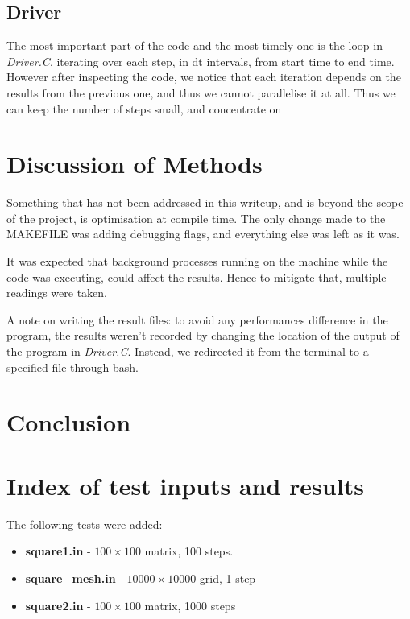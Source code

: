 \documentclass[11pt,journal]{IEEEtran}
\begin{document}
	\subsection{Driver}
	The most important part of the code and the most timely one is the loop in \emph{Driver.C}, iterating over each step, in dt intervals, from start time to end time. However after inspecting the code, we notice that each iteration depends on the results from the previous one, and thus we cannot parallelise it at all. Thus we can keep the number of steps small, and concentrate on 
	
	\section{Discussion of Methods}
	Something that has not been addressed in this writeup, and is beyond the scope of the project, is optimisation at compile time. The only change made to the MAKEFILE was adding debugging flags, and everything else was left as it was.
	
	It was expected that background processes running on the machine while the code was executing, could affect the results. Hence to mitigate that, multiple readings were taken.
	
	A note on writing the result files: to avoid any performances difference in the program, the results weren't recorded by changing the location of the output of the program in \emph{Driver.C}. Instead, we redirected it from the terminal to a specified file through bash.
	
	\section{Conclusion}
	
	
	
	
		
		
	\appendices
	\section{Index of test inputs and results}
	The following tests were added:
	\begin{itemize}
		\item \textbf{square1.in} - $100 \times 100$ matrix, 100 steps.
		\item \textbf{square\_mesh.in} - $10000 \times 10000$ grid, 1 step
		\item \textbf{square2.in} - $100 \times 100$ matrix, 1000 steps
	\end{itemize}
	
\end{document}
